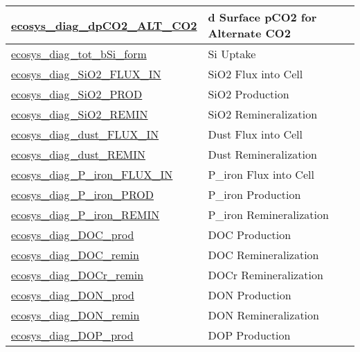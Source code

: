 {\begin{center}
\begin{longtable}{| p{2.0in} | p{4.0in} |}
    \hline
    \hyperref[subsec:var_sec_forcing_ecosys_diag_dpCO2_ALT_CO2]{ecosys\_diag\_dpCO2\_ALT\_CO2} & d Surface pCO2 for Alternate CO2 \\
    \hline
    \hyperref[subsec:var_sec_forcing_ecosys_diag_tot_bSi_form]{ecosys\_diag\_tot\_bSi\_form} & Si Uptake \\
    \hline
    \hyperref[subsec:var_sec_forcing_ecosys_diag_SiO2_FLUX_IN]{ecosys\_diag\_SiO2\_FLUX\_IN} & SiO2 Flux into Cell \\
    \hline
    \hyperref[subsec:var_sec_forcing_ecosys_diag_SiO2_PROD]{ecosys\_diag\_SiO2\_PROD} & SiO2 Production \\
    \hline
    \hyperref[subsec:var_sec_forcing_ecosys_diag_SiO2_REMIN]{ecosys\_diag\_SiO2\_REMIN} & SiO2 Remineralization \\
    \hline
    \hyperref[subsec:var_sec_forcing_ecosys_diag_dust_FLUX_IN]{ecosys\_diag\_dust\_FLUX\_IN} & Dust Flux into Cell \\
    \hline
    \hyperref[subsec:var_sec_forcing_ecosys_diag_dust_REMIN]{ecosys\_diag\_dust\_REMIN} & Dust Remineralization \\
    \hline
    \hyperref[subsec:var_sec_forcing_ecosys_diag_P_iron_FLUX_IN]{ecosys\_diag\_P\_iron\_FLUX\_\-IN} & P\_iron Flux into Cell \\
    \hline
    \hyperref[subsec:var_sec_forcing_ecosys_diag_P_iron_PROD]{ecosys\_diag\_P\_iron\_PROD} & P\_iron Production \\
    \hline
    \hyperref[subsec:var_sec_forcing_ecosys_diag_P_iron_REMIN]{ecosys\_diag\_P\_iron\_REMIN} & P\_iron Remineralization \\
    \hline
    \hyperref[subsec:var_sec_forcing_ecosys_diag_DOC_prod]{ecosys\_diag\_DOC\_prod} & DOC Production \\
    \hline
    \hyperref[subsec:var_sec_forcing_ecosys_diag_DOC_remin]{ecosys\_diag\_DOC\_remin} & DOC Remineralization \\
    \hline
    \hyperref[subsec:var_sec_forcing_ecosys_diag_DOCr_remin]{ecosys\_diag\_DOCr\_remin} & DOCr Remineralization \\
    \hline
    \hyperref[subsec:var_sec_forcing_ecosys_diag_DON_prod]{ecosys\_diag\_DON\_prod} & DON Production \\
    \hline
    \hyperref[subsec:var_sec_forcing_ecosys_diag_DON_remin]{ecosys\_diag\_DON\_remin} & DON Remineralization \\
    \hline
    \hyperref[subsec:var_sec_forcing_ecosys_diag_DOP_prod]{ecosys\_diag\_DOP\_prod} & DOP Production \\

\end{longtable}
\end{center}}
